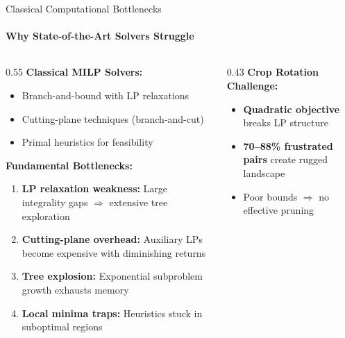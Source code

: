 \documentclass[aspectratio=169,10pt]{beamer}
\begin{document}
\begin{frame}{Classical Computational Bottlenecks}
    \framesubtitle{Why State-of-the-Art Solvers Struggle}
    
    \begin{columns}[T]
        \begin{column}{0.55\textwidth}
            \textbf{Classical MILP Solvers:}
            \begin{itemize}\footnotesize
                \item Branch-and-bound with LP relaxations
                \item Cutting-plane techniques (branch-and-cut)
                \item Primal heuristics for feasibility
            \end{itemize}
            
            \vspace{0.2cm}
            \textbf{Fundamental Bottlenecks:}
            \begin{enumerate}\scriptsize
                \item \textbf{LP relaxation weakness:} Large integrality gaps $\Rightarrow$ extensive tree exploration
                \item \textbf{Cutting-plane overhead:} Auxiliary LPs become expensive with diminishing returns
                \item \textbf{Tree explosion:} Exponential subproblem growth exhausts memory
                \item \textbf{Local minima traps:} Heuristics stuck in suboptimal regions
            \end{enumerate}
        \end{column}
        
        \begin{column}{0.43\textwidth}
            \vspace{0.3cm}
            \textbf{Crop Rotation Challenge:}
            \begin{itemize}\scriptsize
                \item \textbf{Quadratic objective} breaks LP structure
                \item \textbf{70--88\% frustrated pairs} create rugged landscape
                \item Poor bounds $\Rightarrow$ no effective pruning
            \end{itemize}
            

\end{column}
\end{columns}
\end{frame}
\end{document}
